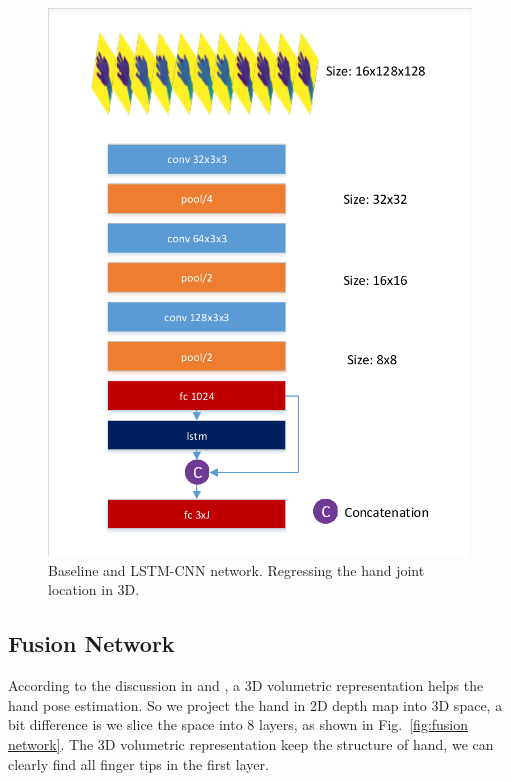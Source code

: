 \documentclass[journal,comsoc]{IEEEtran}
\let\MYoriglatexcaption\caption
\renewcommand{\caption}[2][\relax]{\MYoriglatexcaption[#2]{#2}}
\begin{document}
\begin{figure}[t]
{\begin{minipage}[t]{240pt}
            \includegraphics[width=1\linewidth]{src/network/lstm.pdf}
        \end{minipage}
    }
\caption{Baseline and LSTM-CNN network. Regressing the hand joint location in 3D.}
\label{fig:baseline and lstm network}
\end{figure}


\subsection{Fusion Network}\label{sec:fusion network}
According to the discussion in \cite{supancic2015depth} and \cite{deng2017hand3d}, a 3D volumetric representation helps the hand
pose estimation. So we project the hand in 2D depth map into 3D space, a bit difference is we slice the space into 8 layers,
as shown in Fig.~\ref{fig:fusion network}. The 3D volumetric representation keep the structure of hand, we can clearly find all
finger tips in the first layer.
\end{document}
